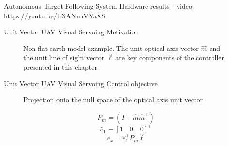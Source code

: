 \documentclass[9pt]{beamer}
\begin{document}
\begin{frame}{Autonomous Target Following System}
Hardware results - video
\linebreak
\linebreak
\href{https://youtu.be/hXANnuVYaX8}{https://youtu.be/hXANnuVYaX8}
\end{frame}

\begin{frame}{Unit Vector UAV Visual Servoing}
Motivation
\begin{figure}[htbp]
	\centering
	\caption{Non-flat-earth model example. The unit optical axis vector $\hat{m}$ and the unit line of sight vector $\hat{\ell}$ are key components of the controller presented in this chapter.}
	\label{nonflatearth}
\end{figure}
\end{frame}

\begin{frame}{Unit Vector UAV Visual Servoing}
Control objective
\begin{figure}[htbp]
	\centering
	\caption{Projection onto the null space of the optical axis unit vector}
	\label{projection}
\end{figure}
\begin{equation}
P_{\hat{m}}=(I-\hat{m}\hat{m}^\top)
\end{equation}
\begin{equation}
\hat{e}_1=[1 \quad 0 \quad 0]^\top
\end{equation}
\begin{equation}
e_x=\hat{e}_1^{\top}P_{\hat{m}}\hat{\ell}
\end{equation}
\end{frame}
\end{document}
